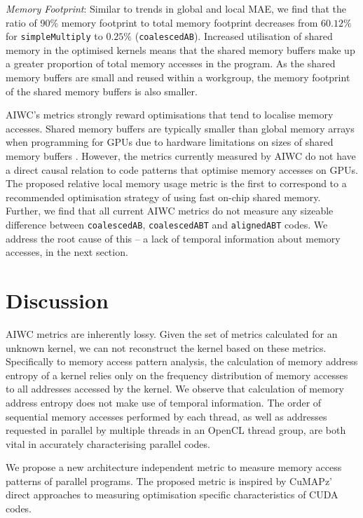 \documentclass[review=false, sigchi]{acmart}
\begin{document}
	\textit{Memory Footprint}: Similar to trends in global and local MAE, we find that the ratio of 90\% memory footprint to total memory footprint decreases from $60.12\%$ for \texttt{simpleMultiply} to $0.25\%$ (\texttt{coalescedAB}). Increased utilisation of shared memory in the optimised kernels means that the shared memory buffers make up a greater proportion of total memory accesses in the program. As the shared memory buffers are small and reused within a workgroup, the memory footprint of the shared memory buffers is also smaller. 
	
	AIWC's metrics strongly reward optimisations that tend to localise memory accesses. Shared memory buffers are typically smaller than global memory arrays when programming for GPUs due to hardware limitations on sizes of shared memory buffers \cite{cudamanual}. However, the metrics currently measured by AIWC do not have a direct causal relation to code patterns that optimise memory accesses on GPUs. The proposed relative local memory usage metric is the first to correspond to a recommended optimisation strategy of using fast on-chip shared memory. Further, we find that all current AIWC metrics do not measure any sizeable difference between \texttt{coalescedAB}, \texttt{coalescedABT} and \texttt{alignedABT} codes. We address the root cause of this -- a lack of temporal information about memory accesses, in the next section.%
	
	\section{Discussion} \label{discussion}
	
	AIWC metrics are inherently lossy. Given the set of metrics calculated for an unknown kernel, we can not reconstruct the kernel based on these metrics. Specifically to memory access pattern analysis, the calculation of memory address entropy of a kernel relies only on the frequency distribution of memory accesses to all addresses accessed by the kernel. We observe that calculation of memory address entropy does not make use of temporal information. The order of sequential memory accesses performed by each thread, as well as addresses requested in parallel by multiple threads in an OpenCL thread group, are both vital in accurately characterising parallel codes.
	
	We propose a new architecture independent metric to measure memory access patterns of parallel programs. The proposed metric is inspired by CuMAPz' direct approaches to measuring optimisation specific characteristics of CUDA codes.
	
\end{document}
